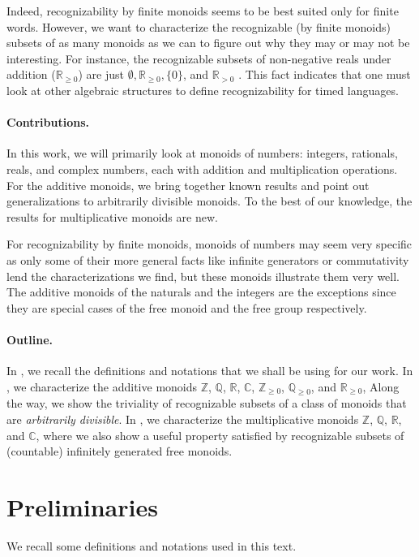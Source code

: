 \documentclass{llncs}
\begin{document}
Indeed, recognizability by finite monoids seems to be best suited only for finite words. However, we want to characterize the recognizable (by finite monoids) subsets of as many monoids as we can to figure out why they may or may not be interesting. For instance, the recognizable subsets of non-negative reals under addition ($\mathbb{R}_{\ge 0}$) are just $\emptyset, \mathbb{R}_{\ge 0}, \{0\}$, and $\mathbb{R}_{> 0}$ \cite{dima2001algebraic}. This fact indicates that one must look at other algebraic structures to define recognizability for timed languages.

\paragraph*{Contributions.}
In this work, we will primarily look at monoids of numbers: integers, rationals, reals, and complex numbers, each with addition and multiplication operations. 
For the additive monoids, we bring together known results and point out generalizations to arbitrarily divisible monoids.
To the best of our knowledge, the results for multiplicative monoids are new. 

For recognizability by finite monoids, monoids of numbers may seem very specific as only some of their more general facts like infinite generators or commutativity lend the characterizations we find, but these monoids illustrate them very well. The additive monoids of the naturals and the integers are the exceptions since they are special cases of the free monoid and the free group respectively.

\paragraph*{Outline.} In , we recall the definitions and notations that we shall be using for our work.
In , we characterize the additive monoids 
\(\mathbb{Z}\),
\(\mathbb{Q}\),
\(\mathbb{R}\),
\(\mathbb{C}\),
\(\mathbb{Z}_{\ge 0}\),
\(\mathbb{Q}_{\ge 0}\),
and \(\mathbb{R}_{\ge 0}\),
Along the way, we show the triviality of recognizable subsets of a class of monoids that are \emph{arbitrarily divisible}.
In , we characterize the multiplicative monoids 
\(\mathbb{Z}\),
\(\mathbb{Q}\), 
\(\mathbb{R}\), and
\(\mathbb{C}\),
where we also show a useful property satisfied by recognizable subsets of (countable) infinitely generated free monoids.

\section{Preliminaries} \label{sec:prelims}
We recall some definitions and notations used in this text.
\end{document}
